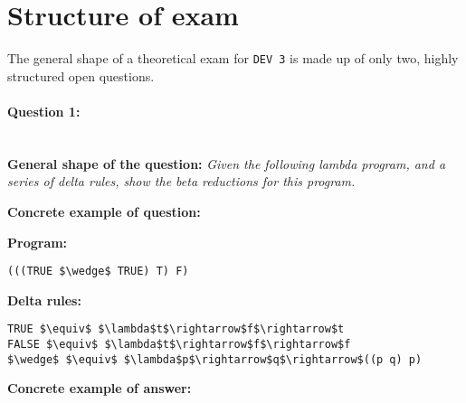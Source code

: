 \section*{Structure of exam \modulecode}
The general shape of a theoretical exam for \texttt{DEV 3} is made up of only two, highly structured open questions.

\paragraph{Question 1: } \ \\

\textbf{General shape of the question:} \textit{Given the following lambda program, and a series of delta rules, show the beta reductions for this program.}

\textbf{Concrete example of question:}

\textbf{Program:}
\lstset{numbers=left,basicstyle=\ttfamily\small}\lstset{language=[Sharp]C}\begin{lstlisting}
(((TRUE $\wedge$ TRUE) T) F)
\end{lstlisting}

\textbf{Delta rules:}
\lstset{numbers=left,basicstyle=\ttfamily\small}\lstset{language=[Sharp]C}\begin{lstlisting}
TRUE $\equiv$ $\lambda$t$\rightarrow$f$\rightarrow$t
FALSE $\equiv$ $\lambda$t$\rightarrow$f$\rightarrow$f
$\wedge$ $\equiv$ $\lambda$p$\rightarrow$q$\rightarrow$((p q) p)
\end{lstlisting}

\textbf{Concrete example of answer:}

